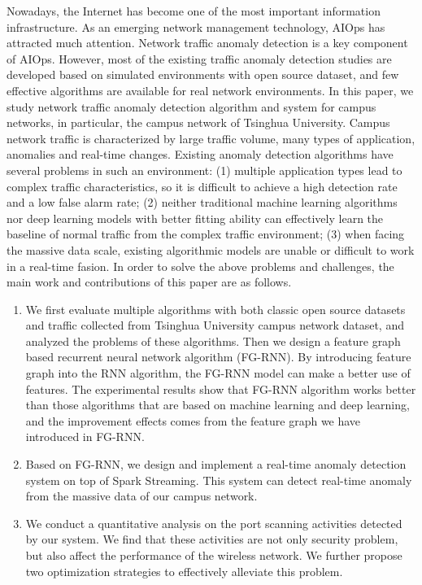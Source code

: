 \begin{abstract*}
  Nowadays, the Internet has become one of the most important information infrastructure. As an emerging network management technology, AIOps has attracted much attention. Network traffic anomaly detection is a key component of AIOps. However, most of the existing traffic anomaly detection studies are developed based on simulated environments with open source dataset, and few effective algorithms are available for real network environments. In this paper, we study network traffic anomaly detection algorithm and system for campus networks, in particular, the campus network of Tsinghua University. Campus network traffic is characterized by large traffic volume, many types of application, anomalies and real-time changes. Existing anomaly detection algorithms have several problems in such an environment: (1) multiple application types lead to complex traffic characteristics, so it is difficult to achieve a high detection rate and a low false alarm rate; (2) neither traditional machine learning algorithms nor deep learning models with better fitting ability can effectively learn the baseline of normal traffic from the complex traffic environment; (3) when facing the massive data scale, existing algorithmic models are unable or difficult to work in a real-time fasion. In order to solve the above problems and challenges, the main work and contributions of this paper are as follows.

  \begin{enumerate}
    \item We first evaluate multiple algorithms with both  classic open source datasets and traffic collected from Tsinghua University campus network dataset, and analyzed the problems of these algorithms. Then we design a feature graph based recurrent neural network algorithm (FG-RNN). By introducing feature graph into the RNN algorithm, the FG-RNN model can make a better use of features. The experimental results show that FG-RNN algorithm works better than those algorithms that are based on machine learning and deep learning, and the improvement effects comes from the feature graph we have introduced in FG-RNN.
    \item Based on FG-RNN, we design and implement a real-time anomaly detection system on top of Spark Streaming. This system can detect real-time anomaly from the massive data of our campus network.
    \item We conduct a quantitative analysis on the port scanning activities detected by our system. We find that these activities are not only security problem, but also affect the performance of the wireless network. We further propose two optimization strategies to effectively alleviate this problem.
  \end{enumerate}



\end{abstract*}
